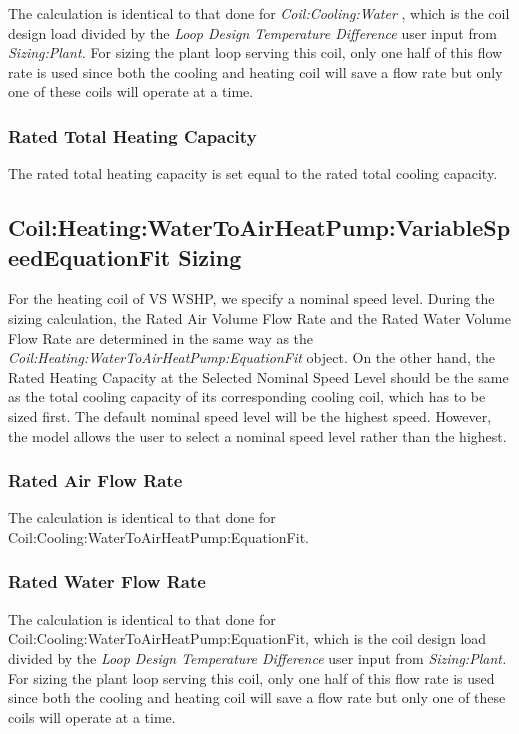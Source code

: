 The calculation is identical to that done for \emph{Coil:Cooling:Water} , which is the coil design load divided by the \emph{Loop Design Temperature Difference} user input from \emph{Sizing:Plant.} For sizing the plant loop serving this coil, only one half of this flow rate is used since both the cooling and heating coil will save a flow rate but only one of these coils will operate at a time.

\subsubsection{Rated Total Heating Capacity}\label{rated-total-heating-capacity}

The rated total heating capacity is set equal to the rated total cooling capacity.

\subsection{Coil:Heating:WaterToAirHeatPump:VariableSpeedEquationFit Sizing}\label{coilheatingwatertoairheatpumpvariablespeedequationfit-sizing}

For the heating coil of VS WSHP, we specify a nominal speed level. During the sizing calculation, the Rated Air Volume Flow Rate and the Rated Water Volume Flow Rate are determined in the same way as the \emph{Coil:Heating:WaterToAirHeatPump:EquationFit} object. On the other hand, the Rated Heating Capacity at the Selected Nominal Speed Level should be the same as the total cooling capacity of its corresponding cooling coil, which has to be sized first. The default nominal speed level will be the highest speed. However, the model allows the user to select a nominal speed level rather than the highest.

\subsubsection{Rated Air Flow Rate}\label{rated-air-flow-rate-3}

The calculation is identical to that done for Coil:Cooling:WaterToAirHeatPump:EquationFit.

\subsubsection{Rated Water Flow Rate}\label{rated-water-flow-rate-3}

The calculation is identical to that done for Coil:Cooling:WaterToAirHeatPump:EquationFit, which is the coil design load divided by the \emph{Loop Design Temperature Difference} user input from \emph{Sizing:Plant.} For sizing the plant loop serving this coil, only one half of this flow rate is used since both the cooling and heating coil will save a flow rate but only one of these coils will operate at a time.

